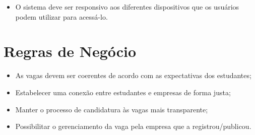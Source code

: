 \begin{itemize}
	\item O sistema deve ser responsivo aos diferentes dispositivos que os usuários podem utilizar para acessá-lo.
\end{itemize}

\section{Regras de Negócio}
\begin{itemize}
	\item As vagas devem ser coerentes de acordo com as expectativas dos estudantes;
	\item Estabelecer uma conexão entre estudantes e empresas de forma justa;
	\item Manter o processo de candidatura às vagas mais transparente;
	\item Possibilitar o gerenciamento da vaga pela empresa que a registrou/publicou.
\end{itemize}

